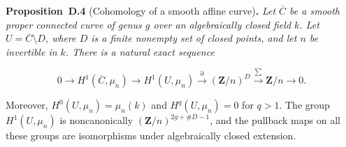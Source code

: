 \documentclass[11pt]{article}
\newenvironment{bpstatement}[2]{\par\addvspace{0.6\baselineskip}\noindent\textbf{#1}#2\textbf{.}\enspace\ignorespaces}
  {\par\addvspace{0.4\baselineskip}}
\newenvironment{bpstatementit}[2]{\begin{bpstatement}{#1}{#2}\itshape\ignorespaces}{\end{bpstatement}}
\begin{document}
\label{bp13}%
\begin{bpstatementit}{Proposition~D.4}{ (Cohomology of a smooth affine curve)}
Let \(\overline C\) be a smooth proper connected curve of genus \(g\) over an algebraically closed field \(k\).  Let \(U=\overline C\setminus D\), where \(D\) is a finite nonempty set of closed points, and let \(n\) be invertible in \(k\).  There is a natural exact sequence

\[
0\longrightarrow H^1(\overline C,\mu_n)
\longrightarrow H^1(U,\mu_n)
\xrightarrow{\partial}(\mathbf Z/n)^D
\xrightarrow{\sum}\mathbf Z/n\longrightarrow0.
\tag{D.1}
\]

Moreover, \(H^0(U,\mu_n)=\mu_n(k)\) and \(H^q(U,\mu_n)=0\) for \(q>1\). The group \(H^1(U,\mu_n)\) is noncanonically \((\mathbf Z/n)^{2g+\#D-1}\), and the pullback maps on all these groups are isomorphisms under algebraically closed extension.
\end{bpstatementit}
\end{document}
